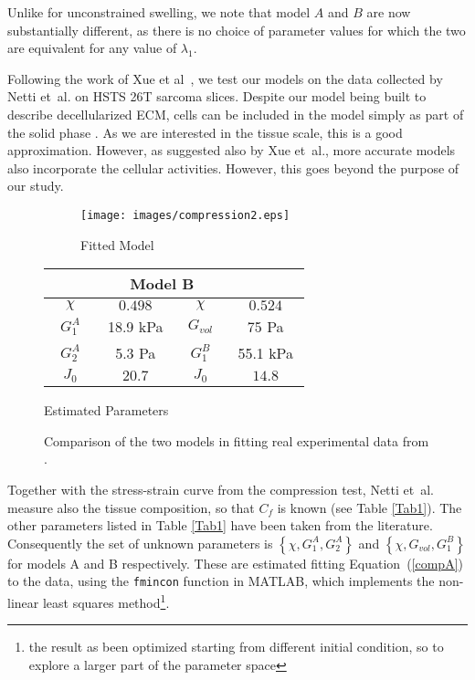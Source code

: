 Unlike for unconstrained swelling, we note that model $A$ and $B$ are now substantially different, as there is no choice of parameter values for which the two are equivalent for any value of $\lambda_1$. 

Following the work of Xue et al~\cite{ecm2}, we test our models on the data collected by Netti et~al. \cite{Netti} on HSTS 26T sarcoma slices. Despite our model being built to describe decellularized ECM, cells can be included in the model simply as part of the solid phase \cite{ecm2}. As we are interested in the tissue scale, this is a good approximation. However, as suggested also by Xue et~al.\cite{ecm2}, more accurate models also incorporate the cellular activities. However, this goes beyond the purpose of our study.

\begin{figure}[h]
	\hspace{-8mm}
	\begin{subfigure}{0.62\textwidth}
		\hspace{2mm}
		\texttt{[image: images/compression2.eps]}
		\caption{Fitted Model}
		\label{fit}
	\end{subfigure}
	\begin{subtable}{0.375\textwidth}
		\begin{tabular}{c | c ||c| c }		
			\hline\addlinespace[2pt]
			\multicolumn{2}{c||}{Model A} &  \multicolumn{2}{c}{Model B}\\[0.5mm]
			\hline\addlinespace[2pt]
			$\quad \chi\quad$ & $\quad0.498\quad$ &$\quad \chi\quad$&$\quad0.524\quad$\\[0.5mm]
			$G^A_1$ & 18.9 kPa&$G_{vol}$&75 Pa\\[0.5mm]
			$G^A_2$ & 5.3 Pa&$G^{B}_{1}$& 55.1 kPa\\[0.5mm]
			$J_0$ & $20.7$&  $J_0$&$14.8$\\[0.5mm]
			\hline
		\end{tabular}
		\caption{Estimated Parameters}
		\label{param}
	\end{subtable}
	\caption{Comparison of the two models in fitting real experimental data from \cite{Netti}.}		
\end{figure}

Together with the stress-strain curve from the compression test, Netti et~al. measure also the tissue composition, so that $C_f$ is known (see Table \ref{Tab1}). The other parameters listed in Table \ref{Tab1} have been taken from the literature. Consequently the set of unknown parameters is $\left\{\chi, G^A_1, G^A_2\right\}$ and $\left\{\chi, G_{vol}, G^B_1\right\}$ for models A and B respectively. These are estimated fitting Equation~(\ref{compA}) to the data, using the \texttt{fmincon} function in MATLAB, which implements the non-linear least squares method\footnote{the result as been optimized starting from different initial condition, so to explore a larger part of the parameter space}.


